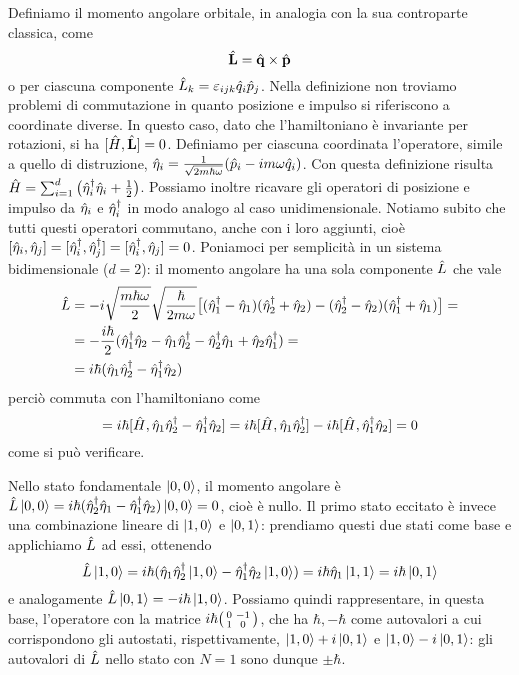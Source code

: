 Definiamo il momento angolare orbitale, in analogia con la sua controparte classica, come
\begin{equation}
	\hat{\mathbf{L}}=\hat{\mathbf{q}}\times\hat{\mathbf{p}}
\end{equation}
o per ciascuna componente $\hat{L}_k=\varepsilon_{ijk}\hat{q}_i\hat{p}_j$.
Nella definizione non troviamo problemi di commutazione in quanto posizione e impulso si riferiscono a coordinate diverse.
In questo caso, dato che l'hamiltoniano è invariante per rotazioni, si ha $[\hat{H},\hat{\mathbf{L}}]=0$.
Definiamo per ciascuna coordinata l'operatore, simile a quello di distruzione, $\hat{\eta}_i=\frac1{\sqrt{2m\hbar\omega}}(\hat{p}_i-im\omega\hat{q}_i)$.
Con questa definizione risulta $\hat{H}=\sum_{i=1}^d\big({\hat{\eta}_i}^\dagger\hat{\eta}_i+\frac12\big)$.
Possiamo inoltre ricavare gli operatori di posizione e impulso da $\hat{\eta}_i$ e ${\hat{\eta}_i}^\dagger$ in modo analogo al caso unidimensionale.
Notiamo subito che tutti questi operatori commutano, anche con i loro aggiunti, cioè $[\hat{\eta}_i,\hat{\eta}_j]=[{\hat{\eta}_i}^\dagger,{\hat{\eta}_j}^\dagger]=[{\hat{\eta}_i}^\dagger,\hat{\eta}_j]=0$.
Poniamoci per semplicità in un sistema bidimensionale ($d=2$): il momento angolare ha una sola componente $\hat{L}$ che vale
\begin{equation}
	\begin{split}
		\hat{L}&=-i\sqrt{\frac{m\hbar\omega}2}\sqrt{\frac{\hbar}{2m\omega}}\big[({\hat{\eta}_1}^\dagger-\hat{\eta}_1)({\hat{\eta}_2}^\dagger+\hat{\eta}_2)-({\hat{\eta}_2}^\dagger-\hat{\eta}_2)({\hat{\eta}_1}^\dagger+\hat{\eta}_1)\big]=\\
		&=-\frac{i\hbar}2({\hat{\eta}_1}^\dagger\hat{\eta}_2-\hat{\eta}_1{\hat{\eta}_2}^\dagger-{\hat{\eta}_2}^\dagger\hat{\eta}_1+\hat{\eta}_2{\hat{\eta}_1}^\dagger)=\\
		&=i\hbar(\hat{\eta}_1{\hat{\eta}_2}^\dagger-{\hat{\eta}_1}^\dagger\hat{\eta}_2)
	\end{split}
\end{equation}
perciò commuta con l'hamiltoniano come
\begin{equation}
	[\op H,\op L]=i\hbar[\op H,\op\eta_1\adj{\op\eta_2}-\adj{\op\eta_1}\op\eta_2]=i\hbar[\op H,\op\eta_1\adj{\op\eta_2}]-i\hbar[\op H,\adj{\op\eta_1}\op\eta_2]=0
\end{equation}
come si può verificare.

Nello stato fondamentale $\left|{0,0}\right\rangle$, il momento angolare è $\hat{L}\left|{0,0}\right\rangle=i\hbar({\hat{\eta}_2}^\dagger\hat{\eta}_1-{\hat{\eta}_1}^\dagger\hat{\eta}_2)\left|{0,0}\right\rangle=0$, cioè è nullo.
Il primo stato eccitato è invece una combinazione lineare di $\left|{1,0}\right\rangle$ e $\left|{0,1}\right\rangle$: prendiamo questi due stati come base e applichiamo $\hat{L}$ ad essi, ottenendo
\begin{equation}
	\hat{L}\left|{1,0}\right\rangle=i\hbar(\hat{\eta}_1{\hat{\eta}_2}^\dagger\left|{1,0}\right\rangle-{\hat{\eta}_1}^\dagger\hat{\eta}_2\left|{1,0}\right\rangle)=i\hbar\hat{\eta}_1\left|{1,1}\right\rangle=i\hbar\left|{0,1}\right\rangle
\end{equation}
e analogamente $\hat{L}\left|{0,1}\right\rangle=-i\hbar\left|{1,0}\right\rangle$.
Possiamo quindi rappresentare, in questa base, l'operatore con la matrice $i\hbar\begin{psmallmatrix}0&-1\\1&0\end{psmallmatrix}$, che ha $\hbar,-\hbar$ come autovalori a cui corrispondono gli autostati, rispettivamente, $\left|{1,0}\right\rangle+i\left|{0,1}\right\rangle$ e $\left|{1,0}\right\rangle-i\left|{0,1}\right\rangle$: gli autovalori di $\hat{L}$ nello stato con $N=1$ sono dunque $\pm\hbar$.

